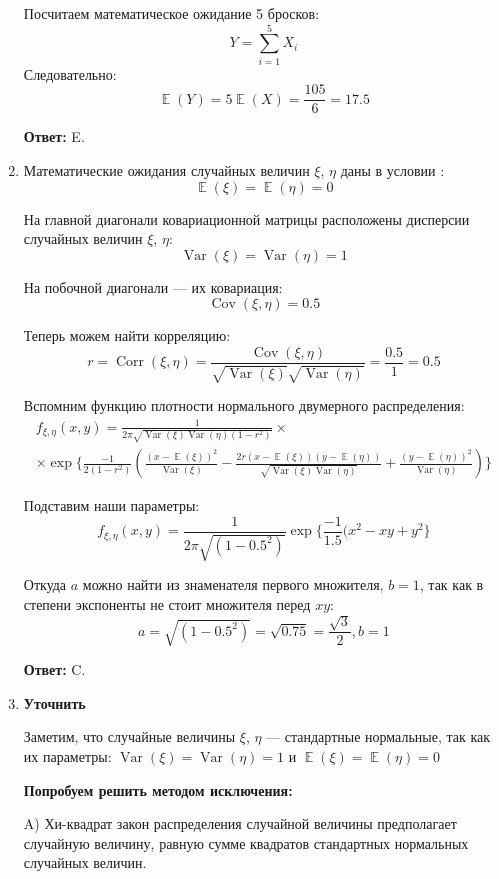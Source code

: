 \documentclass[a4paper]{article} %
\DeclareMathOperator{\Var}{Var}
\DeclareMathOperator{\Cov}{Cov}
\DeclareMathOperator{\Corr}{Corr}
\DeclareMathOperator{\E}{\mathbb{E}}
\begin{document}
\begin{enumerate}
    Посчитаем математическое ожидание 5 бросков:
    \[
    Y = \sum_{i=1}^5 X_i
    \]
    Следовательно:
    \[
    \E(Y) = 5\E(X) = \frac{105}{6} = 17.5
    \]
    
    \textbf{Ответ:} E.
    
    
    \item
    Математические ожидания случайных величин $\xi$, $\eta $ даны в условии :
    \[
    \E(\xi) = \E(\eta) = 0
    \]
    
    На главной диагонали ковариационной матрицы расположены дисперсии случайных величин $\xi$, $\eta $: 
    \[
    \Var(\xi) = \Var(\eta) = 1
    \]
    
    На побочной диагонали — их ковариация: 
    \[
    \Cov(\xi, \eta) = 0.5
    \]
    
    Теперь можем найти корреляцию:
    \[
    r = \Corr(\xi, \eta) = \frac{\Cov(\xi, \eta)}{\sqrt{\Var(\xi)}\sqrt{\Var(\eta)}} = \frac{0.5}{1} = 0.5
    \]
    
    Вспомним функцию плотности нормального двумерного распределения:
    \begin{align*}
    f_{\xi, \eta}(x,y) = \frac{1}{2\pi\sqrt{\Var(\xi)\Var(\eta)(1-r^2)}} \times \\ 
    \times \exp{\{\frac{-1}{2(1-r^2)}(\frac{(x-\E(\xi))^2}{\Var(\xi)}-\frac{2r(x-\E(\xi))(y-\E(\eta))}{\sqrt{\Var(\xi)\Var(\eta)}}+\frac{(y-\E(\eta))^2}{\Var(\eta)})\}}  
    \end{align*}
    
    Подставим наши параметры:
    \[
    f_{\xi, \eta}(x,y) = \frac{1}{2\pi\sqrt{(1-0.5^2)}} \exp{\{\frac{-1}{1.5}(x^2-xy+y^2\}}
    \]
    
    Откуда $a$ можно найти из знаменателя первого множителя, $b=1$, так как в степени экспоненты не стоит множителя перед $xy$:
    \[
    a = \sqrt{(1-0.5^2)} = \sqrt{0.75} = \frac{\sqrt{3}}{2}, b=1
    \] 
    
    \textbf{Ответ:} C.
    
    
    \item
    \textbf{Уточнить}
    
    Заметим, что случайные величины $\xi$, $\eta $ — стандартные нормальные, так как их параметры: $\Var(\xi) = \Var(\eta) = 1$ и $\E(\xi) = \E(\eta) = 0$
    
    \textbf{Попробуем решить методом исключения:}
    
    A) Хи-квадрат закон распределения случайной величины предполагает случайную величину, равную сумме квадратов стандартных нормальных случайных величин.
    

\end{enumerate}
\end{document}
